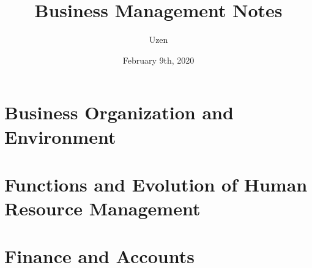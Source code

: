 \documentclass{report}
\title{Business Management Notes}
\author{Uzen}
\date{February 9th, 2020}
\begin{document}
\maketitle
\newpage
\tableofcontents
\newpage

\chapter{Business Organization and Environment}

\chapter{Functions and Evolution of Human Resource Management}


\chapter{Finance and Accounts}

\end{document}
